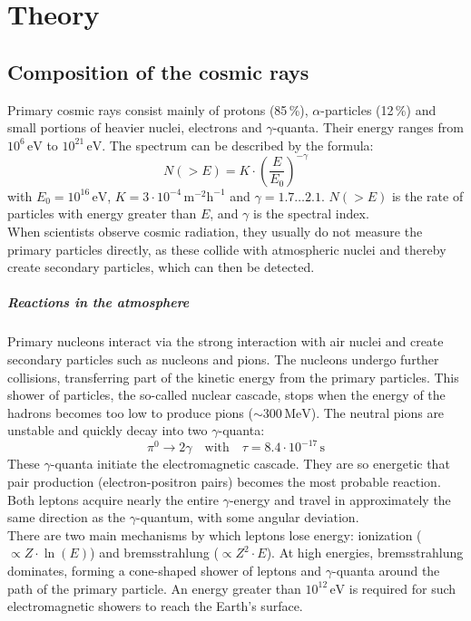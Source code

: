 \chapter{Theory}
\section{Composition of the cosmic rays}
Primary cosmic rays consist mainly of protons (85\,\%), $\alpha$-particles (12\,\%) and small portions of heavier nuclei, electrons and $\gamma$-quanta. Their energy ranges from $10^6\, \mathrm{eV}$ to $10^{21}\, \mathrm{eV}$. The spectrum can be described by the formula:
\[
N(>E) = K\cdot \left(\frac{E}{E_0}\right)^{-\gamma}
\]
with $E_0 = 10^{16}\, \text{eV}$, $K = 3\cdot 10^{-4}\, \text{m}^{-2}\text{h}^{-1}$ and $\gamma = 1.7 \ldots 2.1$. $N(>E)$ is the rate of particles with energy greater than $E$, and $\gamma$ is the spectral index.\\
When scientists observe cosmic radiation, they usually do not measure the primary particles directly, as these collide with atmospheric nuclei and thereby create secondary particles, which can then be detected.
\paragraph{Reactions in the atmosphere}
Primary nucleons interact via the strong interaction with air nuclei and create secondary particles such as nucleons and pions. The nucleons undergo further collisions, transferring part of the kinetic energy from the primary particles. This shower of particles, the so-called nuclear cascade, stops when the energy of the hadrons becomes too low to produce pions ($\sim 300\, \text{MeV}$). The neutral pions are unstable and quickly decay into two $\gamma$-quanta:
\[
\pi^0 \rightarrow 2\gamma \quad \text{with} \quad \tau = 8.4 \cdot 10^{-17}\, \text{s}
\]
These $\gamma$-quanta initiate the electromagnetic cascade. They are so energetic that pair production (electron-positron pairs) becomes the most probable reaction. Both leptons acquire nearly the entire $\gamma$-energy and travel in approximately the same direction as the $\gamma$-quantum, with some angular deviation.\\
There are two main mechanisms by which leptons lose energy: ionization ($\propto Z \cdot \ln(E)$) and bremsstrahlung ($\propto Z^2 \cdot E$). At high energies, bremsstrahlung dominates, forming a cone-shaped shower of leptons and $\gamma$-quanta around the path of the primary particle. An energy greater than $10^{12}\, \mathrm{eV}$ is required for such electromagnetic showers to reach the Earth's surface.
